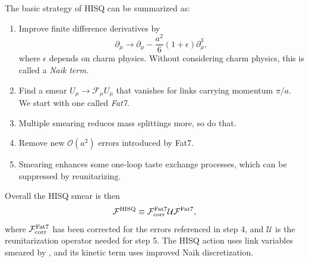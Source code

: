 The basic strategy of HISQ can be summarized as:
\begin{enumerate}
  \item Improve finite difference derivatives by 
        \vspace{-1mm}
        \begin{equation*}
         \partial_\mu\to\partial_\mu-\frac{a^2}{6}(1+\epsilon)\partial_\mu^3,
        \end{equation*}
        where $\epsilon$ depends on charm physics. Without considering
        charm physics, this is called a {\it Naik term}.
  \item Find a smear $U_\mu\to\mathcal{F}_\mu U_\mu$ that vanishes
        for links carrying momentum $\pi/a$. We start with one
        called {\it Fat7}.
  \item Multiple smearing reduces mass splittings more, so do that.
  \item Remove new $\mathcal{O}(a^2)$ errors introduced by Fat7.
  \item Smearing enhances some one-loop taste exchange processes,
        which can be suppressed by reunitarizing.
\end{enumerate}
Overall the HISQ smear is then
\begin{equation}\label{eq:HISQsmear}
\mathcal{F}^{\rm HISQ}\equiv
\mathcal{F}^{\rm Fat7}_{\rm corr}\mathcal{U}\mathcal{F}^{\rm Fat7},
\end{equation}
where $\mathcal{F}^{\rm Fat7}_{\rm corr}$ has been corrected for the
errors referenced in step 4, and $\mathcal{U}$ is the reunitarization
operator needed for step 5. The HISQ action uses link variables smeared
by , and its kinetic term uses improved
Naik discretization.

